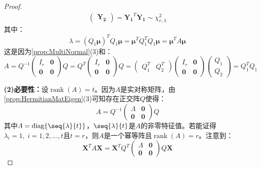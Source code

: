 \begin{proof}
\begin{align*}
\begin{pmatrix}
			\mathbf{Y_2}
		\end{pmatrix}
		=\mathbf{Y_1}^T\mathbf{Y_1}\sim\chi_{r,\lambda}^2
	\end{align*}
	其中：
	\begin{equation*}
		\lambda=(Q_1\boldsymbol{\mu})^TQ_1\boldsymbol{\mu}=\boldsymbol{\mu}^TQ_1^TQ_1\boldsymbol{\mu}=\boldsymbol{\mu}^TA\boldsymbol{\mu}
	\end{equation*}
	这是因为\cref{prop:MultiNormal}(3)和：
	\begin{equation*}
		A=Q^{-1}
		\begin{pmatrix}
			I_r & \mathbf{0} \\
			\mathbf{0} & \mathbf{0}
		\end{pmatrix}Q
		=Q^T
		\begin{pmatrix}
			I_r & \mathbf{0} \\
			\mathbf{0} & \mathbf{0}
		\end{pmatrix}Q
		=
		\begin{pmatrix}
			Q_1^T & Q_2^T
		\end{pmatrix}
			\begin{pmatrix}
			I_r & \mathbf{0} \\
			\mathbf{0} & \mathbf{0}
		\end{pmatrix}
		\begin{pmatrix}
			Q_1 \\
			Q_2
		\end{pmatrix}
		=Q_1^TQ_1
	\end{equation*}\par
	\textbf{(2)必要性：}设$\operatorname{rank}(A)=t$。因为$A$是实对称矩阵，由\cref{prop:HermitianMatEigen}(3)可知存在正交阵$Q$使得：
	\begin{equation*}
		A=Q^{-1}
		\begin{pmatrix}
			\varLambda & \mathbf{0} \\
			\mathbf{0} & \mathbf{0}
		\end{pmatrix}
		Q
	\end{equation*}
	其中$\varLambda=\operatorname{diag}\{\seq{\lambda}{t}\}$，$\seq{\lambda}{t}$是$A$的非零特征值。若能证得$\lambda_i=1,\;i=1,2,\dots,t$且$t=r$，则$A$是一个幂等阵且$\operatorname{rank}(A)=r$。注意到：
	\begin{equation*}
		\mathbf{X}^TA\mathbf{X}=\mathbf{X}^TQ^T
		\begin{pmatrix}
			\varLambda & \mathbf{0} \\
			\mathbf{0} & \mathbf{0}
		\end{pmatrix}
		Q\mathbf{X}
	\end{equation*}

\end{proof}
